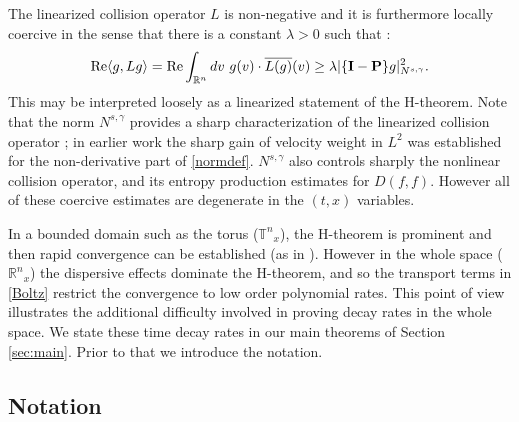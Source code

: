 \documentclass{amsart}
\numberwithin{equation}{section}
\begin{document}
 The linearized collision operator ${L}$ is non-negative and it is furthermore locally coercive in
the sense that there is a constant ${\lambda}>0$ such that \cite[Theorem 8.1]{gsNonCut0}:  
\begin{equation}\label{coerc}
{{\rm Re}} { \left< {{g, {L} g}} \right> }
=
{{\rm Re}} \int_{{\mathbb R}^{n}} dv ~ g(v) \cdot \overline{L(g)}(v)
\geq 
{\lambda}{|}\{{\mathbf{I}}-{\mathbf{P}}\}g{|}^2_{N^{s,\gamma}}.
\end{equation}
This may be interpreted loosely as a linearized statement of the H-theorem.  Note that the norm ${N^{s,\gamma}}$ provides a sharp  characterization of the linearized collision operator \cite[(2.13)]{gsNonCut0}; in earlier work \cite{MR2322149} the sharp gain of velocity weight in $L^2$ was established for the non-derivative part of \eqref{normdef}.  ${N^{s,\gamma}}$ also controls sharply the nonlinear collision operator, and its entropy production estimates \cite{gsNonCutEst} for $D(f,f)$.  However all of these coercive estimates are degenerate in the $(t,x)$ variables.

In a bounded domain such as the torus (${\mathbb{T}^{n}}_x$), the H-theorem is prominent and then rapid convergence can be established (as in \cite{gsNonCutA,gsNonCut0}).  However in the whole space (${{\mathbb R}^{n}}_x$) the dispersive effects dominate the H-theorem, and so the transport terms in \eqref{Boltz} restrict the convergence to low order polynomial rates.  This point of view illustrates the additional difficulty involved in proving decay rates in the whole space.
We state these time decay rates in our main theorems of Section \ref{sec:main}.  Prior to that we introduce the notation.

\subsection{Notation}
\end{document}
